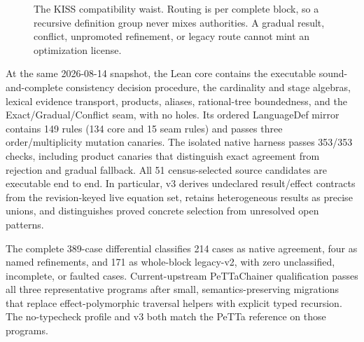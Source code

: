 \documentclass[11pt]{article}
\begin{document}
\begin{figure}[ht]
\centering
{}
\caption{The KISS compatibility waist.  Routing is per complete block, so a
recursive definition group never mixes authorities.  A gradual result,
conflict, unpromoted refinement, or legacy route cannot mint an optimization
license.}
\label{fig:petta-typecheck-authority}
\end{figure}

At the same 2026-08-14 snapshot, the Lean core contains the executable
sound-and-complete consistency decision procedure, the cardinality and stage
algebras, lexical evidence transport, products, aliases, rational-tree
boundedness, and the Exact/Gradual/Conflict seam, with no holes.  Its ordered
LanguageDef mirror contains 149 rules (134 core and 15 seam rules) and passes
three order/multiplicity mutation canaries.  The isolated native harness
passes 353/353 checks, including product canaries that distinguish exact
agreement from rejection and gradual fallback.  All 51 census-selected
source candidates are executable end to end.  In particular, v3 derives
undeclared result/effect
contracts from the revision-keyed live equation set, retains heterogeneous
results as precise unions, and distinguishes proved concrete selection from
unresolved open patterns.

The complete 389-case differential classifies 214 cases as native agreement,
four as named refinements, and 171 as whole-block legacy-v2, with zero
unclassified, incomplete, or faulted cases.  Current-upstream PeTTaChainer
qualification passes all three representative programs after small,
semantics-preserving migrations that replace effect-polymorphic traversal
helpers with explicit typed recursion.  The no-typecheck profile and v3 both
match the PeTTa reference on those programs.
\end{document}
